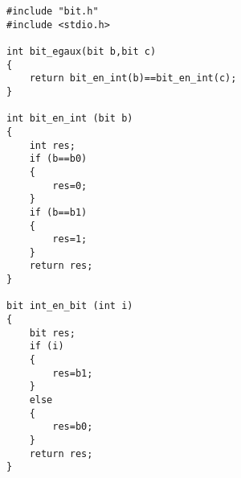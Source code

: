 
\begin{verbatim}
#include "bit.h"
#include <stdio.h>

int bit_egaux(bit b,bit c)
{
	return bit_en_int(b)==bit_en_int(c);
}

int bit_en_int (bit b)
{
	int res;
	if (b==b0) 
	{
		res=0;
	}
	if (b==b1)
	{
		res=1;
	}
	return res;
}

bit int_en_bit (int i)
{
	bit res;
	if (i) 
	{
		res=b1;
	}
	else 
	{
		res=b0;
	}
	return res;
}

\end{verbatim}
 

